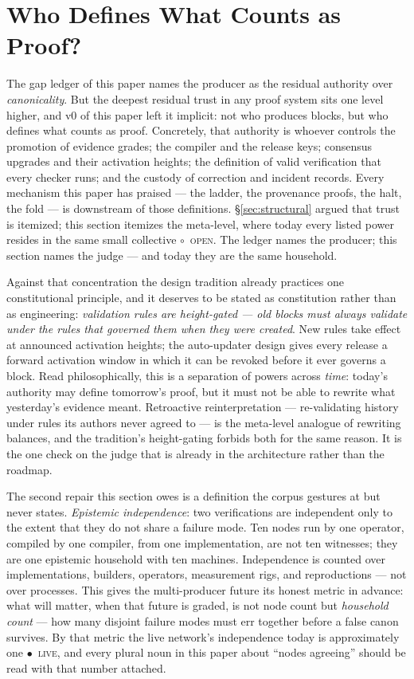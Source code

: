 \documentclass[10pt,a4paper]{article}
\newcommand{\stO}{\textcolor{sigilamber}{$\circ$}~{\scriptsize\textcolor{sigilamber}{\textsc{open}}}}
\newcommand{\stL}{\textcolor{sigilcyan}{$\bullet$}~{\scriptsize\textcolor{sigilcyan}{\textsc{live}}}}
\begin{document}
\section{Who Defines What Counts as Proof?}\label{sec:whodefines}

The gap ledger of this paper names the producer as the residual authority over
\emph{canonicality}. But the deepest residual trust in any proof system sits one
level higher, and v0 of this paper left it implicit: not who produces blocks, but
who defines what counts as proof. Concretely, that authority is whoever controls
the promotion of evidence grades; the compiler and the release keys; consensus
upgrades and their activation heights; the definition of valid verification that
every checker runs; and the custody of correction and incident records. Every
mechanism this paper has praised — the ladder, the provenance proofs, the halt,
the fold — is downstream of those definitions. \S\ref{sec:structural} argued that
trust is itemized; this section itemizes the meta-level, where today every listed
power resides in the same small collective \stO. The ledger names the producer;
this section names the judge — and today they are the same household.

Against that concentration the design tradition already practices one
constitutional principle, and it deserves to be stated as constitution rather than
as engineering: \emph{validation rules are height-gated — old blocks must always
validate under the rules that governed them when they were created}. New rules
take effect at announced activation heights; the auto-updater design gives every
release a forward activation window in which it can be revoked before it ever
governs a block. Read philosophically, this is a separation of powers across
\emph{time}: today's authority may define tomorrow's proof, but it must not be
able to rewrite what yesterday's evidence meant. Retroactive reinterpretation —
re-validating history under rules its authors never agreed to — is the meta-level
analogue of rewriting balances, and the tradition's height-gating forbids both
for the same reason. It is the one check on the judge that is already in the
architecture rather than the roadmap.

The second repair this section owes is a definition the corpus gestures at but
never states. \emph{Epistemic independence}: two verifications are independent
only to the extent that they do not share a failure mode. Ten nodes run by one
operator, compiled by one compiler, from one implementation, are not ten
witnesses; they are one epistemic household with ten machines. Independence is
counted over implementations, builders, operators, measurement rigs, and
reproductions — not over processes. This gives the multi-producer future its
honest metric in advance: what will matter, when that future is graded, is not
node count but \emph{household count} — how many disjoint failure modes must err
together before a false canon survives. By that metric the live network's
independence today is approximately one \stL, and every plural noun in this paper
about ``nodes agreeing'' should be read with that number attached.
\end{document}
